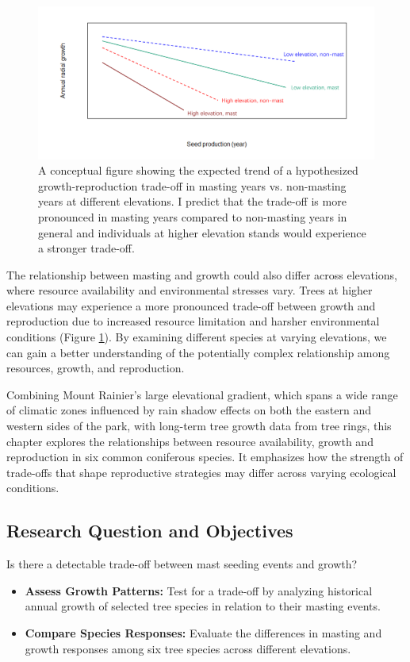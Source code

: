 \documentclass[11pt,letter]{article}
\begin{document}
\begin{figure}[H]
	\centering
	\includegraphics[width=1\linewidth]{conceptualFigureChap2.png}
	\caption{A conceptual figure showing the expected trend of a hypothesized growth-reproduction trade-off in masting years vs. non-masting years at different elevations. I predict that the trade-off is more pronounced in masting years compared to non-masting years in general and individuals at higher elevation stands would experience a stronger trade-off.}
	\label{fig:conceptual2}
\end{figure}
The relationship between masting and growth could also differ across elevations, where resource availability and environmental stresses vary. Trees at higher elevations may experience a more pronounced trade-off between growth and reproduction due to increased resource limitation and harsher environmental conditions (Figure \ref{fig:conceptual2}). By examining different species at varying elevations, we can gain a better understanding of the potentially complex relationship among resources, growth, and reproduction.

Combining Mount Rainier's large elevational gradient, which spans a wide range of climatic zones influenced by rain shadow effects on both the eastern and western sides of the park, with long-term tree growth data from tree rings, this chapter explores the relationships between resource availability, growth and reproduction in six common coniferous species. It emphasizes how the strength of trade-offs that shape reproductive strategies may differ across varying ecological conditions.

\subsection{Research Question and Objectives}
Is there a detectable trade-off between mast seeding events and growth?
	\begin{itemize}
	\item \textbf{Assess Growth Patterns:} Test for a trade-off by analyzing historical annual growth of selected tree species in relation to their masting events.
	\item \textbf{Compare Species Responses:} Evaluate the differences in masting and growth responses among six tree species across different elevations.
	\end{itemize}
\end{document}
